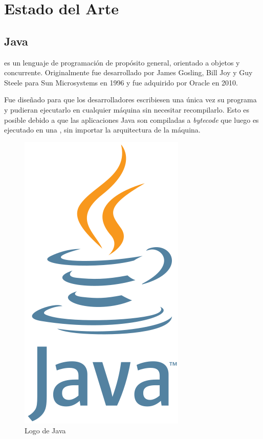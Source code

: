 
\chapter{Estado del Arte} %

\label{Chapter3}


\section{Java}

 es un lenguaje de programación de propósito general, orientado a objetos y concurrente.
Originalmente fue desarrollado por James Gosling, Bill Joy y Guy Steele para Sun Microsystems en 1996 y fue adquirido por Oracle en 2010.

Fue diseñado para que los desarrolladores escribiesen una única vez su programa y pudieran ejecutarlo en cualquier máquina sin necesitar recompilarlo.
Esto es posible debido a que las aplicaciones Java son compiladas a \emph{bytecode} que luego es ejecutado en una ,
sin importar la arquitectura de la máquina. \emph{\parencite{Reference13}}

\begin{figure}[ht]
  \centering
  \includegraphics[scale=0.3]{Figures/JavaLogo}
  \decoRule
  \caption[Java (Logo)]{Logo de Java \emph{\parencite{Reference6}}}
  \label{fig:JavaLogo}
\end{figure}

